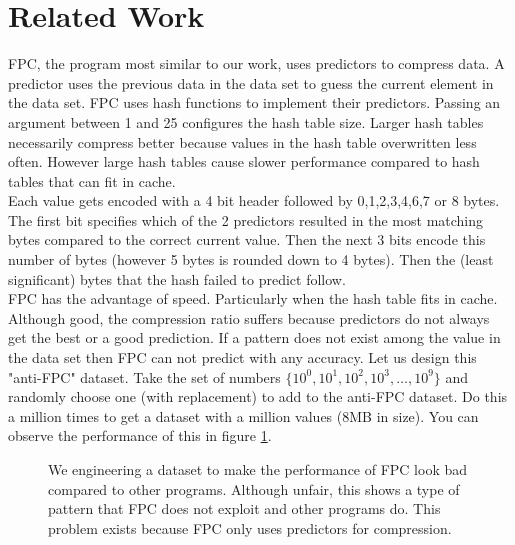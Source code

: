 \section{Related Work}
\label{sec:relatedWork}
FPC, the program most similar to our work, uses predictors to compress data. A predictor uses the previous data in the data set to guess the current element in the data set. FPC uses hash functions to implement their predictors. Passing an argument between 1 and 25 configures the hash table size. Larger hash tables necessarily compress better because values in the hash table overwritten less often. However large hash tables cause slower performance compared to hash tables that can fit in cache.\\
\indent Each value gets encoded with a 4 bit header followed by 0,1,2,3,4,6,7 or 8 bytes. The first bit specifies which of the 2 predictors resulted in the most matching bytes compared to the correct current value. Then the next 3 bits encode this number of bytes (however 5 bytes is rounded down to 4 bytes). Then the (least significant) bytes that the hash failed to predict follow.\\
\indent FPC has the advantage of speed. Particularly when the hash table fits in cache. Although good, the compression ratio suffers because predictors do not always get the best or a good prediction. If a pattern does not exist among the value in the data set then FPC can not predict with any accuracy. Let us design this "anti-FPC" dataset. Take the set of numbers $\{10^0, 10^1, 10^2, 10^3, \dots, 10^9\}$ and randomly choose one (with replacement) to add to the anti-FPC dataset. Do this a million times to get a dataset with a million values (8MB in size). You can observe the performance of this in figure \ref{fig:antiFpc}.\\
\begin{figure}
\caption{We engineering a dataset to make the performance of FPC look bad compared to other programs. Although unfair, this shows a type of pattern that FPC does not exploit and other programs do. This problem exists because FPC only uses predictors for compression.}
\label{fig:antiFpc}
\end{figure}
\fi
